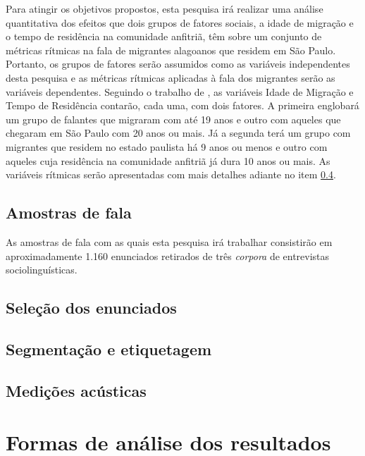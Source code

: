 \documentclass[
	a4paper,	%
	12pt,		%
	]{article}	%
\begin{document}
	Para atingir os objetivos propostos, esta pesquisa irá realizar uma análise quantitativa dos
	efeitos que dois grupos de fatores sociais, a idade de migração e o tempo de residência na
	comunidade anfitriã, têm sobre um conjunto de métricas rítmicas na fala de migrantes alagoanos
	que residem em São Paulo. Portanto, os grupos de fatores serão assumidos como as variáveis
	independentes desta pesquisa e as métricas rítmicas aplicadas à fala dos migrantes serão as
	variáveis dependentes. Seguindo o trabalho de \citet{Oushiro2018}, as variáveis Idade de
	Migração e Tempo de Residência contarão, cada uma, com dois fatores. A primeira englobará um
	grupo de falantes que migraram com até 19 anos e outro com aqueles que chegaram em São Paulo com
	20 anos ou mais. Já a segunda terá um grupo com migrantes que residem no estado paulista há 9
	anos ou menos e outro com aqueles cuja residência na comunidade anfitriã já dura 10 anos ou
	mais. As variáveis rítmicas serão apresentadas com mais detalhes adiante no item \ref{medicoes}.

	\subsection{Amostras de fala} 
	\label{amostra}
	
	As amostras de fala com as quais esta pesquisa irá trabalhar consistirão em aproximadamente
	1.160 enunciados retirados de três \emph{corpora} de entrevistas sociolinguísticas. 
	
	\subsection{Seleção dos enunciados} 
	\label{selecao}

	\subsection{Segmentação e etiquetagem} 
	\label{segm}

	\subsection{Medições acústicas} 
	\label{medicoes}
	
\section{Formas de análise dos resultados} 
\label{analise}

{ %
	\printbibliography
}
\end{document}
